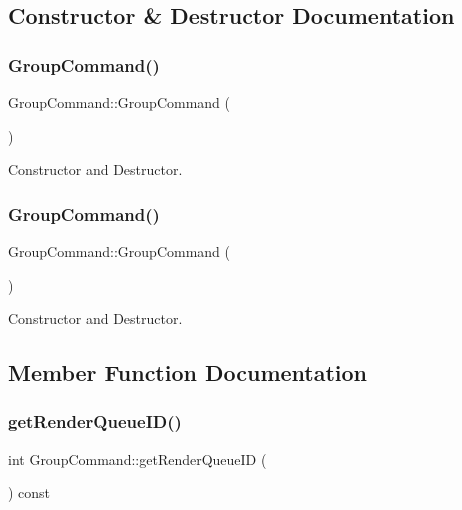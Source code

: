 \subsection{Constructor \& Destructor Documentation}
\mbox{\label{classGroupCommand_aa243a9a0c1d72c54277ef0d5ab95866a}} 
\subsubsection{\texorpdfstring{Group\+Command()}{GroupCommand()}\hspace{0.1cm}{\footnotesize\ttfamily [1/2]}}
{\footnotesize\ttfamily Group\+Command\+::\+Group\+Command (\begin{DoxyParamCaption}{ }\end{DoxyParamCaption})}

Constructor and Destructor. \mbox{\label{classGroupCommand_aa243a9a0c1d72c54277ef0d5ab95866a}} 
\subsubsection{\texorpdfstring{Group\+Command()}{GroupCommand()}\hspace{0.1cm}{\footnotesize\ttfamily [2/2]}}
{\footnotesize\ttfamily Group\+Command\+::\+Group\+Command (\begin{DoxyParamCaption}{ }\end{DoxyParamCaption})}

Constructor and Destructor. 

\subsection{Member Function Documentation}
\mbox{\label{classGroupCommand_adc611e80f004b605a81ec5ac6a3f0230}} 
\subsubsection{\texorpdfstring{get\+Render\+Queue\+I\+D()}{getRenderQueueID()}\hspace{0.1cm}{\footnotesize\ttfamily [1/2]}}
{\footnotesize\ttfamily int Group\+Command\+::get\+Render\+Queue\+ID (\begin{DoxyParamCaption}{ }\end{DoxyParamCaption}) const\hspace{0.3cm}{\ttfamily [inline]}}

